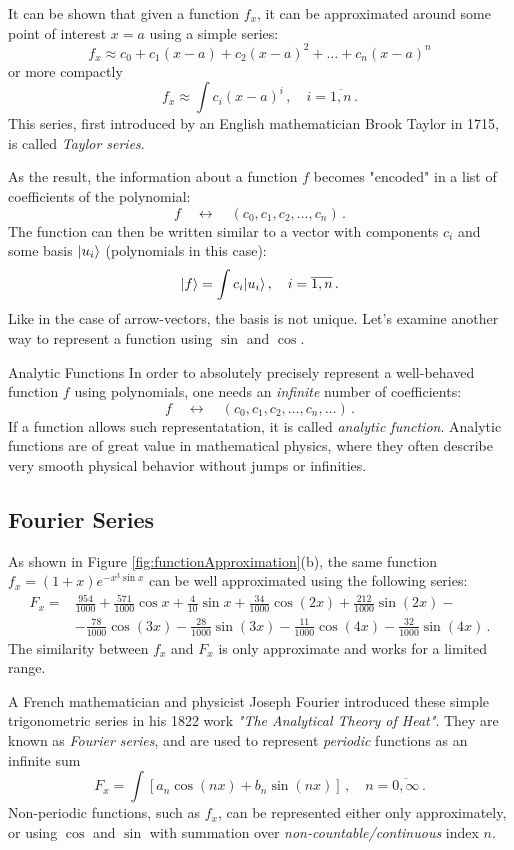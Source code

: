 It can be shown that given a function $f_x$, it can be approximated around some point of interest $x=a$ using a simple series:
\[
f_x \approx c_0 + c_1(x-a)+c_2(x-a)^2+\ldots+ c_n(x-a)^n 
\]
or more compactly
\[
f_x \approx \int c_i(x-a)^i\,,\quad i=\overline{1, n}\,.
\]
This series, first introduced by an English mathematician Brook Taylor in 1715, is called \emph{Taylor series}.

As the result, the information about a function $f$ becomes "encoded" in a list of coefficients of the polynomial:
\[
f\quad\leftrightarrow\quad (c_0, c_1, c_2, \ldots, c_n)\,.
\]
The function can then be written similar to a vector with components $c_i$ and some basis $|{u_i}\rangle$ (polynomials in this case):
\[
|{f}\rangle = \int c_i|{u_i}\rangle\,,\quad i=\overline{1, n}\,.
\]
Like in the case of arrow-vectors, the basis is not unique. Let's examine another way to represent a function using $\sin$ and $\cos$.

\begin{mybio}{Analytic Functions}
	In order to absolutely precisely represent a well-behaved function $f$ using polynomials, one needs an \emph{infinite} number of coefficients:
	\[
	f\quad\leftrightarrow\quad (c_0, c_1, c_2, \ldots, c_n,\ldots)\,.
	\]
	If a function allows such representatation, it is called \emph{analytic function}. Analytic functions are of great value in mathematical physics, where they often describe very smooth physical behavior without jumps or infinities.
\end{mybio}


\subsection{Fourier Series}
As shown in Figure \ref{fig:functionApproximation}(b), the same function $f_x=(1+x)e^{-x^3\sin x}$ can be well approximated using the following series:
\begin{align*}
	F_x = & \frac{954}{1000}+\frac{571}{1000}\cos x+\frac{4}{10}\sin x+\frac{34}{1000}\cos (2x)+\frac{212}{1000}\sin(2x)-\\
	& -\frac{78}{1000}\cos (3x)-\frac{28}{1000}\sin(3x)-\frac{11}{1000}\cos (4x)-\frac{32}{1000}\sin (4x)\,.
\end{align*}
The similarity between $f_x$ and $F_x$ is only approximate and works for a limited range. 

A French mathematician and physicist Joseph Fourier introduced these simple trigonometric series in his 1822 work \emph{"The Analytical Theory of Heat"}. They are known as \emph{Fourier series}, and are used to represent \emph{periodic} functions as an infinite sum
\[
F_x = \int \left\lbrack a_n\cos(n x)+b_n\sin(n x)\right\rbrack \,,\quad n=\overline{0,\infty}\,.
\]
 Non-periodic functions, such as $f_x$, can be represented either only approximately, or using $\cos$ and $\sin$ with summation over \emph{non-countable/continuous} index $n$. 
 
